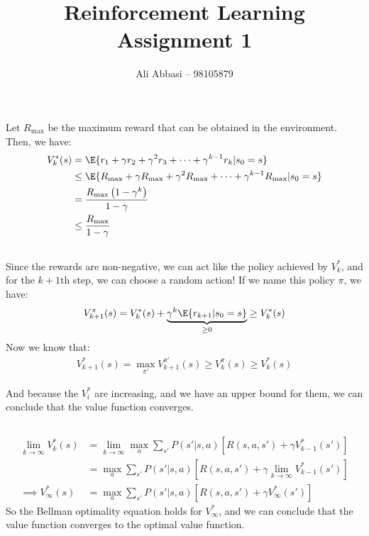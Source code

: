 \documentclass{article}
\title{Reinforcement Learning Assignment 1}
\author{Ali Abbasi -- 98105879}
\begin{document}
\maketitle
\tableofcontents
\pagebreak

\section{}
\subsection{}
Let \(R_{\max}\) be the maximum reward that can be obtained in the environment. Then, we have:
\begin{align*}
V_k^*(s) &= \E{ r_1 + \gamma r_2 + \gamma^2 r_3 + \cdots + \gamma^{k-1} r_k | s_0 = s }\\
&\le \E{R_{\max} + \gamma R_{\max} + \gamma^2 R_{\max} + \cdots + \gamma^{k-1} R_{\max} | s_0 = s}\\
&= \frac{R_{\max} \left(1 - \gamma^k\right)}{1 - \gamma}\\
&\le \frac{R_{\max}}{1 - \gamma}
\end{align*}

\subsection{}
Since the rewards are non-negative, we can act like the policy achieved by \(V_k^*\), and for the \(k+1\)th step, we can choose a random action! If we name this policy \(\pi\), we have:
\begin{align*}
V_{k+1}^{\pi}(s) = V_{k}^*(s) + \underbrace{\gamma^k \E{r_{k+1}|s_0 = s}}_{\ge 0} \ge V_{k}^*(s)    
\end{align*}
Now we know that:
\begin{align*}
V_{k+1}^*(s) = \max_{\pi'} V_{k+1}^{\pi'}(s) \ge V_{k}^{\pi}(s) \ge V_{k}^*(s)
\end{align*}

And because the \(V_i^*\) are increasing, and we have an upper bound for them, we can conclude that the value function converges.

\subsection{}
\begin{align*}
\lim_{k\to \infty} V_k^*(s) &= \lim_{k\to \infty} \max_a \sum_{s'} P(s'|s,a) \left[ R(s,a,s') + \gamma V_{k-1}^*(s') \right]\\
&= \max_a \sum_{s'} P(s'|s,a) \left[ R(s,a,s') + \gamma \lim_{k\to \infty} V_{k-1}^*(s') \right]\\
\implies V_{\infty}^*(s) &= \max_a \sum_{s'} P(s'|s,a) \left[ R(s,a,s') + \gamma V_{\infty}^*(s') \right]
\end{align*}
So the Bellman optimality equation holds for \(V_{\infty}^*\), and we can conclude that the value function converges to the optimal value function. 
\end{document}
